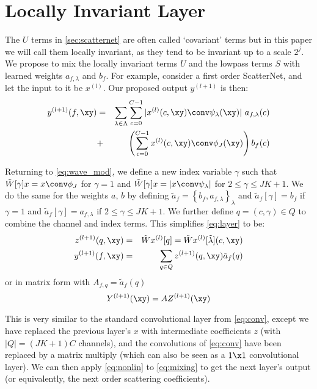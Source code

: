 \section{Locally Invariant Layer} \label{sec:method}
The $U$ terms in \autoref{sec:scatternet} are often called `covariant' terms but
in this paper we will call them locally invariant, as they tend to be invariant up to a
scale $2^j$.  We propose to mix the locally invariant terms $U$ and the
lowpass terms $S$ with learned weights $a_{f,\lambda}$ and $b_f$. For example,
consider a first order ScatterNet, and let the input to it be $x^{(l)}$. Our
proposed output $y^{(l+1)}$ is then:
%
\begin{eqnarray} \label{eq:comb1}
  y^{(l+1)}(f, \xy) & = & \sum_{\lambda\in \Lambda} \sum_{c=0}^{C-1} |x^{(l)}(c, \xy)\conv \psi_\lambda(\xy)|\ a_{f, \lambda}(c) \nonumber \\
                    & + & \left(\sum_{c=0}^{C-1} x^{(l)}(c, \xy) \conv \phi_J(\xy)\right) b_f(c)
  \label{eq:layer}
\end{eqnarray}

Returning to \autoref{eq:wave_mod}, we define a new index variable $\gamma$
such that $\tilde{W}[\gamma]x = x\conv \phi_J$ for $\gamma = 1$ and
$\tilde{W}[\gamma]x = |x \conv \psi_{\lambda}|$ for $2 \leq \gamma \leq JK + 1$.
We do the same for the weights $a$, $b$ by defining $\tilde{a}_f = \left\{b_f,
a_{f, \lambda} \right\}_\lambda$ and $\tilde{a}_f[\gamma] = b_f$ if $\gamma = 1$
and $\tilde{a}_f[\gamma] = a_{f, \lambda}$ if $2 \leq \gamma \leq JK + 1$.
We further define $q = (c, \gamma) \in Q$ to combine the channel
and index terms.  This simplifies \autoref{eq:layer} to be:
%
\begin{eqnarray}
  z^{(l+1)}(q, \xy) & = & \tilde{W}x^{(l)}[q] = \tilde{W}x^{(l)}[\tilde{\lambda}](c, \xy) \label{eq:covariant}\\
  y^{(l+1)}(f, \xy) & = & \sum_{q \in Q} z^{(l+1)}(q, \xy) \tilde{a}_f(q) \label{eq:mixing}
\end{eqnarray}
or in matrix form with $A_{f,q} = \tilde{a}_f(q)$
%
\begin{equation}
  Y^{(l+1)}(\xy)  =  A Z^{(l+1)}(\xy) \label{eq:matrix}
\end{equation}

This is very similar to the standard convolutional layer from
\autoref{eq:conv}, except we have replaced the previous layer's $x$ with
intermediate coefficients $z$ (with $|Q| = (JK+1)C$ channels), and the
convolutions of \autoref{eq:conv} have been replaced by a matrix multiply
(which can also be seen as a $1\x 1$ convolutional layer). We can then apply
\autoref{eq:nonlin} to \autoref{eq:mixing} to get the next layer's output (or
equivalently, the next order scattering coefficients). 

